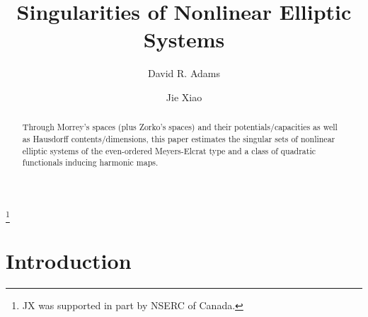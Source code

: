 \documentclass[12pt]{amsart}
\begin{document}
\title[Singularities of Nonlinear Elliptic Systems]{Singularities of Nonlinear Elliptic Systems}
\author{David R. Adams}
\address{Department of Mathematics, University of Kentucky, Lexington, KY 40506-0027}

\author{Jie Xiao}
\address{Department of Mathematics and Statistics, Memorial University of Newfoundland, St. John's, NL A1C 5S7, Canada}
\thanks{JX was supported in part by NSERC of Canada.}


\date{}

\keywords{}

\begin{abstract}
  Through Morrey's spaces (plus Zorko's spaces) and their potentials/capacities as well as Hausdorff contents/dimensions, this paper estimates the singular sets of nonlinear elliptic systems of the even-ordered Meyers-Elcrat type and a class of quadratic functionals inducing harmonic maps.
\end{abstract}
\maketitle

\tableofcontents

\section{Introduction}\label{s1}
\setcounter{equation}{0}
\end{document}
